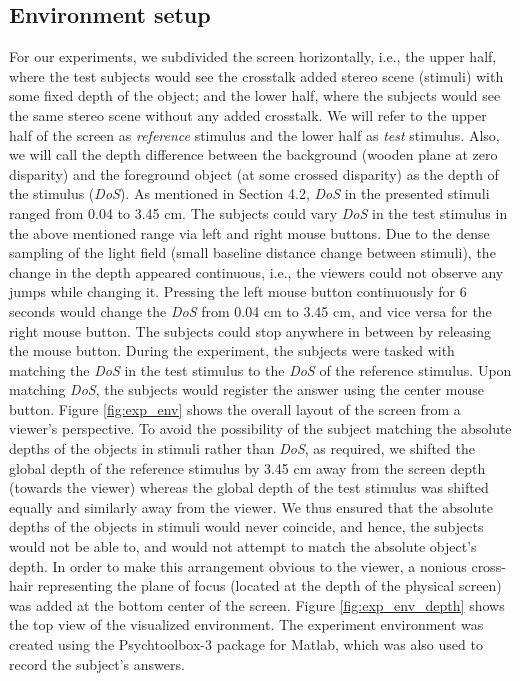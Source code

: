 \subsection{Environment setup}
For our experiments, we subdivided the screen horizontally, i.e., the upper half, where the test subjects would see the crosstalk added stereo scene (stimuli) with some fixed depth of the object; and the lower half, where the subjects would see the same stereo scene without any added crosstalk. We will refer to the upper half of the screen as \emph{reference} stimulus and the lower half as \emph{test} stimulus. Also, we will call the depth difference between the background (wooden plane at zero disparity) and the foreground object (at some crossed disparity) as the depth of the stimulus (\emph{DoS}). As mentioned in Section 4.2, \emph{DoS} in the presented stimuli ranged from 0.04 to 3.45 cm. The subjects could vary \emph{DoS} in the test stimulus in the above mentioned range via left and right mouse buttons. Due to the dense sampling of the light field (small baseline distance change between stimuli), the change in the depth appeared continuous, i.e., the viewers could not observe any jumps while changing it. Pressing the left mouse button continuously for 6 seconds would change the  \emph{DoS} from 0.04 cm to 3.45 cm, and vice versa for the right mouse button. The subjects could stop anywhere in between by releasing the mouse button. During the experiment, the subjects were tasked with matching the \emph{DoS} in the test stimulus to the \emph{DoS} of the reference stimulus. Upon matching \emph{DoS}, the subjects would register the answer using the center mouse button. Figure \ref{fig:exp_env} shows the overall layout of the screen from a viewer's perspective. To avoid the possibility of the subject matching the absolute depths of the objects in stimuli rather than \emph{DoS}, as required, we shifted the global depth of the reference stimulus by 3.45 cm away from the screen depth (towards the viewer) whereas the global depth of the test stimulus was shifted equally and similarly away from the viewer. We thus ensured that the absolute depths of the objects in stimuli would never coincide, and hence, the subjects would not be able to, and would not attempt to match the absolute object's depth. In order to make this arrangement obvious to the viewer, a nonious cross-hair representing the plane of focus (located at the depth of the physical screen) was added at the bottom center of the screen. Figure \ref{fig:exp_env_depth} shows the top view of the visualized environment. The experiment environment was created using the Psychtoolbox-3 package for Matlab, which was also used to record the subject's answers.
